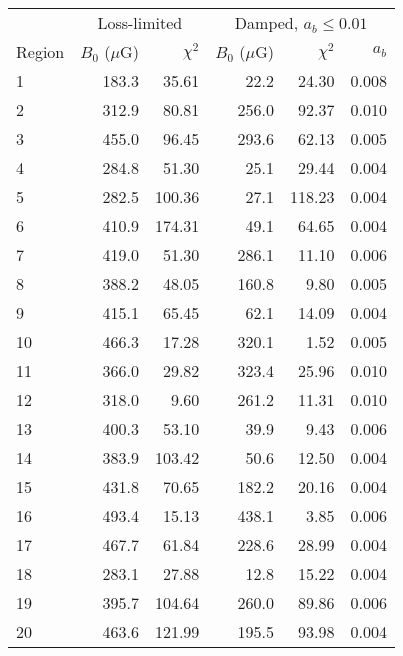 \begin{tabular}{@{} l rr rrr @{}}
\toprule
{} & \multicolumn{2}{c}{Loss-limited}
   & \multicolumn{3}{c}{Damped, $a_b \leq 0.01$} \\
\cmidrule(lr){2-3} \cmidrule(l){4-6}
Region & $B_0$ ($\mu$G) & $\chi^2$
       & $B_0$ ($\mu$G) & $\chi^2$ & $a_b$ \\
\midrule
1 & 183.3 & 35.61 & 22.2 & 24.30 & 0.008 \\
2 & 312.9 & 80.81 & 256.0 & 92.37 & 0.010 \\
3 & 455.0 & 96.45 & 293.6 & 62.13 & 0.005 \\
\cmidrule{1-6}
4 & 284.8 & 51.30 & 25.1 & 29.44 & 0.004 \\
5 & 282.5 & 100.36 & 27.1 & 118.23 & 0.004 \\
6 & 410.9 & 174.31 & 49.1 & 64.65 & 0.004 \\
7 & 419.0 & 51.30 & 286.1 & 11.10 & 0.006 \\
8 & 388.2 & 48.05 & 160.8 & 9.80 & 0.005 \\
9 & 415.1 & 65.45 & 62.1 & 14.09 & 0.004 \\
10 & 466.3 & 17.28 & 320.1 & 1.52 & 0.005 \\
\cmidrule{1-6}
11 & 366.0 & 29.82 & 323.4 & 25.96 & 0.010 \\
12 & 318.0 & 9.60 & 261.2 & 11.31 & 0.010 \\
13 & 400.3 & 53.10 & 39.9 & 9.43 & 0.006 \\
\cmidrule{1-6}
14 & 383.9 & 103.42 & 50.6 & 12.50 & 0.004 \\
15 & 431.8 & 70.65 & 182.2 & 20.16 & 0.004 \\
16 & 493.4 & 15.13 & 438.1 & 3.85 & 0.006 \\
17 & 467.7 & 61.84 & 228.6 & 28.99 & 0.004 \\
\cmidrule{1-6}
18 & 283.1 & 27.88 & 12.8 & 15.22 & 0.004 \\
19 & 395.7 & 104.64 & 260.0 & 89.86 & 0.006 \\
20 & 463.6 & 121.99 & 195.5 & 93.98 & 0.004 \\
\bottomrule
\end{tabular}



